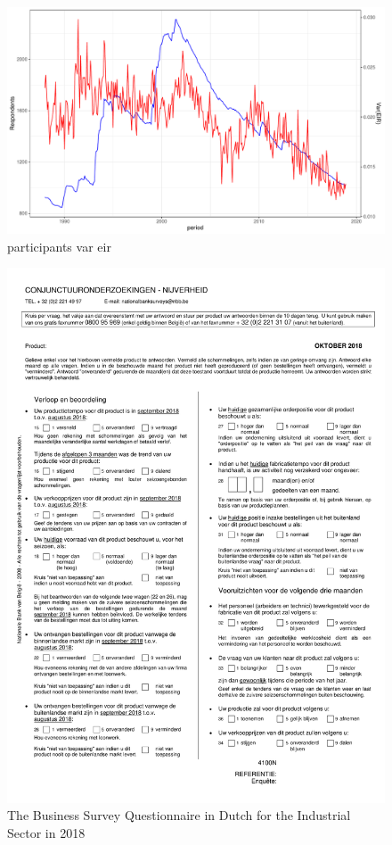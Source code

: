 \documentclass[12pt,a4paper,oneside]{book}
\begin{document}
\begin{figure}[H]
    \centering
    \includegraphics[scale=0.5]{Graphs/participants_var_eir.pdf}
    \caption{participants var eir}
    \label{fig:participants var eir}
\end{figure}





\newpage
\begin{figure}[H]
    \centering
    \includegraphics[scale=0.75]{Images/IndustryN.pdf}
    \caption{The Business Survey Questionnaire in Dutch for the Industrial Sector in 2018}
    \label{Questionnaire2018}
\end{figure}
\end{document}
